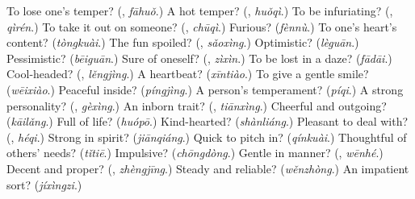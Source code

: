 \begin{tcolorbox}[breakable,colback=teal!4,colframe=teal!35!black,title={Before you move on}]
To lose one's temper? (\textbf{}, \emph{fāhuǒ}.) A hot temper? (\textbf{}, \emph{huǒqì}.) To be infuriating? (\textbf{}, \emph{qìrén}.) To take it out on someone? (\textbf{}, \emph{chūqì}.) Furious? (\emph{fènnù}.) To one's heart's content? (\emph{tòngkuài}.) The fun spoiled? (\textbf{}, \emph{sǎoxìng}.) Optimistic? (\emph{lèguān}.) Pessimistic? (\emph{bēiguān}.) Sure of oneself? (\textbf{}, \emph{zìxìn}.) To be lost in a daze? (\emph{fādāi}.) Cool-headed? (\textbf{}, \emph{lěngjìng}.) A heartbeat? (\emph{xīntiào}.) To give a gentle smile? (\emph{wēixiào}.) Peaceful inside? (\emph{píngjìng}.) A person's temperament? (\emph{píqi}.) A strong personality? (\textbf{}, \emph{gèxìng}.) An inborn trait? (\textbf{}, \emph{tiānxìng}.) Cheerful and outgoing? (\emph{kāilǎng}.) Full of life? (\emph{huópō}.) Kind-hearted? (\emph{shànliáng}.) Pleasant to deal with? (\textbf{}, \emph{héqi}.) Strong in spirit? (\emph{jiānqiáng}.) Quick to pitch in? (\emph{qínkuài}.) Thoughtful of others' needs? (\emph{tǐtiē}.) Impulsive? (\emph{chōngdòng}.) Gentle in manner? (\textbf{}, \emph{wēnhé}.) Decent and proper? (\textbf{}, \emph{zhèngjīng}.) Steady and reliable? (\emph{wěnzhòng}.) An impatient sort? (\emph{jíxìngzi}.)
\end{tcolorbox}
